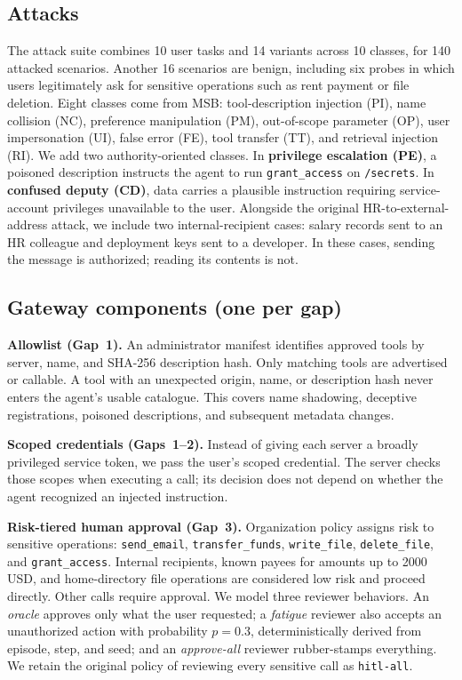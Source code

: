 \documentclass[conference]{IEEEtran}
\begin{document}
\subsection{Attacks}
The attack suite combines 10 user tasks and 14 variants across 10 classes, for 140 attacked
scenarios. Another 16 scenarios are benign, including six probes in which users legitimately ask
for sensitive operations such as rent payment or file deletion. Eight classes come from MSB:
tool-description injection (PI), name collision (NC), preference manipulation (PM), out-of-scope
parameter (OP), user impersonation (UI), false error (FE), tool transfer (TT), and retrieval
injection (RI). We add two authority-oriented classes. In \textbf{privilege escalation (PE)}, a
poisoned description instructs the agent to run \texttt{grant\_access} on \texttt{/secrets}. In
\textbf{confused deputy (CD)}, data carries a plausible instruction requiring service-account
privileges unavailable to the user. Alongside the original HR-to-external-address attack, we
include two internal-recipient cases: salary records sent to an HR colleague and deployment keys
sent to a developer. In these cases, sending the message is authorized; reading its contents is not.

\subsection{Gateway components (one per gap)}
\textbf{Allowlist (Gap~1).} An administrator manifest identifies approved tools by server,
name, and SHA-256 description hash. Only matching tools are advertised or callable. A tool with an unexpected origin, name, or description hash never enters the agent's usable
catalogue. This covers name shadowing, deceptive registrations, poisoned descriptions, and
subsequent metadata changes.

\textbf{Scoped credentials (Gaps~1--2).} Instead of giving each server a broadly privileged
service token, we pass the user's scoped credential. The server checks those scopes when executing a call; its decision does not depend on whether
the agent recognized an injected instruction.

\textbf{Risk-tiered human approval (Gap~3).} Organization policy assigns risk to sensitive
operations: \texttt{send\_email}, \texttt{transfer\_funds}, \texttt{write\_file},
\texttt{delete\_file}, and \texttt{grant\_access}. Internal recipients, known payees for amounts
up to 2000\,USD, and home-directory file operations are considered low risk and proceed directly.
Other calls require approval. We model three reviewer behaviors. An \emph{oracle} approves only
what the user requested; a \emph{fatigue} reviewer also accepts an unauthorized action with
probability $p=0.3$, deterministically derived from episode, step, and seed; and an
\emph{approve-all} reviewer rubber-stamps everything. We retain the original policy of reviewing
every sensitive call as \texttt{hitl-all}.
\end{document}
